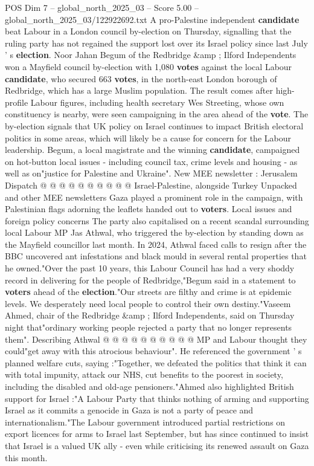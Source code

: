 \begin{textsample}{POS Dim 7 – global\_north\_2025\_03 – Score 5.00 – global\_north\_2025\_03/122922692.txt}  \label{ex:f7_pos_322}
A pro-Palestine independent \textbf{candidate} beat Labour in a London council by-election on Thursday, signalling that the ruling party has not regained the support lost over its Israel policy since last July ' s \textbf{election}.
Noor Jahan Begum of the Redbridge \&amp ; Ilford Independents won a Mayfield council by-election with 1,080 \textbf{votes} against the local Labour \textbf{candidate}, who secured 663 \textbf{votes}, in the north-east London borough of Redbridge, which has a large Muslim population.
The result comes after high-profile Labour figures, including health secretary Wes Streeting, whose own constituency is nearby, were seen campaigning in the area ahead of the \textbf{vote}.
The by-election signals that UK policy on Israel continues to impact British electoral politics in some areas, which will likely be a cause for concern for the Labour leadership.
Begum, a local magistrate and the winning \textbf{candidate}, campaigned on hot-button local issues - including council tax, crime levels and housing - as well as on"justice for Palestine and Ukraine".
New MEE newsletter : Jerusalem Dispatch @ @ @ @ @ @ @ @ @ @ Israel-Palestine, alongside Turkey Unpacked and other MEE newsletters Gaza played a prominent role in the campaign, with Palestinian flags adorning the leaflets handed out to \textbf{voters}.
Local issues and foreign policy concerns The party also capitalised on a recent scandal surrounding local Labour MP Jas Athwal, who triggered the by-election by standing down as the Mayfield councillor last month.
In 2024, Athwal faced calls to resign after the BBC uncovered ant infestations and black mould in several rental properties that he owned."Over the past 10 years, this Labour Council has had a very shoddy record in delivering for the people of Redbridge,"Begum said in a statement to \textbf{voters} ahead of the \textbf{election}."Our streets are filthy and crime is at epidemic levels.
We desperately need local people to control their own destiny."Vaseem Ahmed, chair of the Redbridge \&amp ; Ilford Independents, said on Thursday night that"ordinary working people rejected a party that no longer represents them".
Describing Athwal @ @ @ @ @ @ @ @ @ @ MP and Labour thought they could"get away with this atrocious behaviour".
He referenced the government ' s planned welfare cuts, saying :"Together, we defeated the politics that think it can with total impunity, attack our NHS, cut benefits to the poorest in society, including the disabled and old-age pensioners."Ahmed also highlighted British support for Israel :"A Labour Party that thinks nothing of arming and supporting Israel as it commits a genocide in Gaza is not a party of peace and internationalism."The Labour government introduced partial restrictions on export licences for arms to Israel last September, but has since continued to insist that Israel is a valued UK ally - even while criticising its renewed assault on Gaza this month.

\end{textsample}
